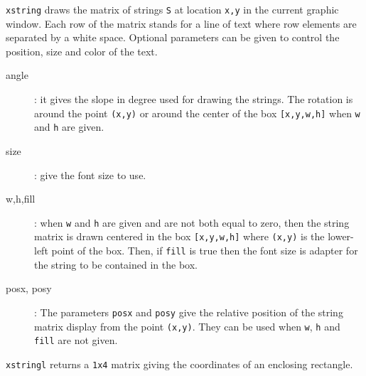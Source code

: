 \begin{mandescription}
  \verb!xstring! draws the matrix of strings \verb!S! at location \verb!x,y!
  in the current graphic window. Each row of the matrix
  stands for a line of text where row elements are separated by a white space.
  Optional parameters can be given to control the position, size and color of the
  text.

  \begin{description}
  \item[angle]: it gives the slope in degree used for drawing the strings.
    The rotation is around the point \verb!(x,y)! or around the center of the box \verb![x,y,w,h]!
    when  \verb!w! and \verb!h! are given.
  \item[size]: give the font size to use.
  \item[w,h,fill]: when \verb!w! and \verb!h! are given and are not both equal to zero,
    then the string matrix is drawn centered in the box \verb![x,y,w,h]! where
    \verb!(x,y)! is the lower-left point of the box. Then, if \verb!fill! is true
    then the font size is adapter for the string to be contained in the box.
  \item[posx, posy]: The parameters \verb!posx! and \verb!posy! give the relative
    position of the string matrix display from the point \verb!(x,y)!. They can be used
    when \verb!w!, \verb!h! and \verb!fill! are not given.
  \end{description}

  \verb!xstringl! returns a \verb!1x4! matrix giving the coordinates of an enclosing rectangle.

\end{mandescription}

